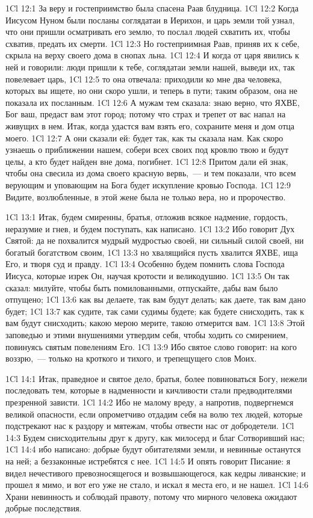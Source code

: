 \vs 1Cl 12:1
За веру и гостеприимство
была спасена Раав блудница.
\vs 1Cl 12:2
Когда Иисусом Нуном были
посланы соглядатаи в Иерихон, и царь земли той узнал, что они пришли
осматривать его землю, то послал людей схватить их, чтобы схватив, предать их
смерти.
\vs 1Cl 12:3
Но гостеприимная Раав,
приняв их к себе, скрыла на верху своего дома в снопах льна.
\vs 1Cl 12:4
И когда от царя явились к
ней и говорили: люди пришли к тебе, соглядатаи земли нашей, выведи их, так
повелевает царь,
\vs 1Cl 12:5
то она отвечала: приходили
ко мне два человека, которых вы ищете, но они скоро ушли, и теперь в пути;
таким образом, она не показала их посланным.
\vs 1Cl 12:6
А мужам тем сказала: знаю
верно, что ЯХВЕ, Бог ваш, предаст вам этот город; потому что страх и трепет от
вас напал на живущих в нем. Итак, когда удастся вам взять его, сохраните меня
и дом отца моего.
\vs 1Cl 12:7
А они сказали ей: будет
так, как ты сказала нам. Как скоро узнаешь о приближении нашем, собери всех
своих под кровлю твою и будут целы, а кто будет найден вне дома, погибнет.
\vs 1Cl 12:8
Притом дали ей знак, чтобы
она свесила из дома своего красную вервь,~--- и тем показали, что всем верующим
и уповающим на Бога будет искупление кровью Господа.
\vs 1Cl 12:9
Видите, возлюбленные, в
этой жене была не только вера, но и пророчество.

\vs 1Cl 13:1
Итак, будем смиренны,
братья, отложив всякое надмение, гордость, неразумие и гнев, и будем
поступать, как написано.
\vs 1Cl 13:2
Ибо говорит Дух Святой:
да не похвалится мудрый мудростью своей, ни сильный силой своей, ни богатый
богатством своим,
\vs 1Cl 13:3
но хвалящийся пусть
хвалится ЯХВЕ, ища Его, и творя суд и правду.
\vs 1Cl 13:4
Особенно будем помнить
слова Господа Иисуса, которые изрек Он, научая кротости и великодушию.
\vs 1Cl 13:5
Он так сказал: милуйте,
чтобы быть помилованными, отпускайте, дабы вам было отпущено;
\vs 1Cl 13:6
как вы делаете, так вам
будут делать; как даете, так вам дано будет;
\vs 1Cl 13:7
как судите, так сами
судимы будете; как будете снисходить, так к вам будут снисходить; какою мерою
мерите, такою отмерится вам.
\vs 1Cl 13:8
Этой заповедью и этими
внушениями утвердим себя, чтобы ходить со смирением, повинуясь святым
повелениям Его.
\vs 1Cl 13:9
Ибо святое слово говорит:
на кого воззрю,~--- только на кроткого и тихого, и трепещущего слов Моих.

\vs 1Cl 14:1
Итак, праведное и святое
дело, братья, более повиноваться Богу, нежели последовать тем, которые в
надменности и кичливости стали предводителями презренной зависти.
\vs 1Cl 14:2
Ибо не малому вреду, а
напротив, подвергнемся великой опасности, если опрометчиво отдадим себя на
волю тех людей, которые подстрекают нас к раздору и мятежам, чтобы отвести нас
от добродетели.
\vs 1Cl 14:3
Будем снисходительны друг
к другу, как милосерд и благ Сотворивший нас;
\vs 1Cl 14:4
ибо написано: добрые
будут обитателями земли, и невинные останутся на ней; а беззаконные истребятся
с нее.
\vs 1Cl 14:5
И опять говорит Писание:
я видел нечестивого превозносящегося и возвышающегося, как кедры ливанские; и
прошел я мимо, и вот его уже не стало, и искал я места его, и не нашел.
\vs 1Cl 14:6
Храни невинность и
соблюдай правоту, потому что мирного человека ожидают добрые последствия.

